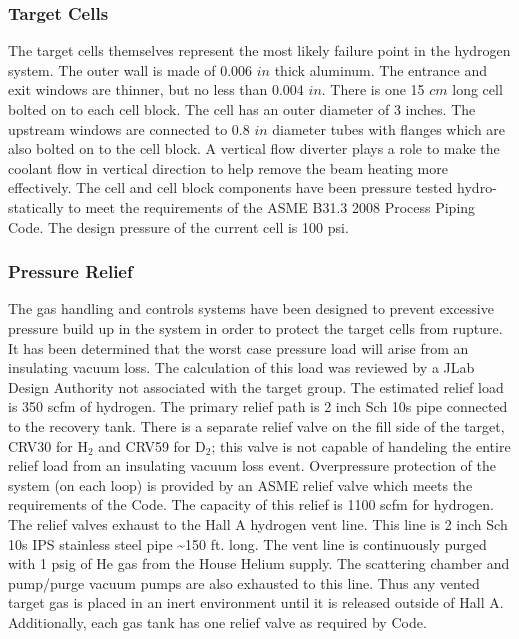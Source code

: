 \subsubsection{Target Cells}

The target cells themselves represent the most likely failure point
in the hydrogen system. The outer wall is made of 0.006 $in$ thick
aluminum. The entrance and exit windows are thinner, but no less than
0.004 $in$. There is one 15 $cm$ long cell bolted on to each cell
block. The cell has an outer diameter of 3 inches. The upstream windows
are connected to 0.8 $in$ diameter tubes with flanges which are also
bolted on to the cell block. A vertical flow diverter plays a role
to make the coolant flow in vertical direction to help remove the
beam heating more effectively. The cell and cell block components
have been pressure tested hydro-statically to meet the requirements
of the ASME B31.3 2008 Process Piping Code. The design pressure of
the current cell is 100 psi.


\subsubsection{Pressure Relief}

The gas handling and controls systems have been designed to prevent
excessive pressure build up in the system in order to protect the
target cells from rupture. It has been determined that the worst case
pressure load will arise from an insulating vacuum loss. The calculation
of this load was reviewed by a JLab Design Authority not associated
with the target group. The estimated relief load is 350 scfm of hydrogen.
The primary relief path is 2 inch Sch 10s pipe connected to the recovery
tank. There is a separate relief valve on the fill side of the target,
CRV30 for H$_{2}$ and CRV59 for D$_{2}$; this valve is not capable
of handeling the entire relief load from an insulating vacuum loss
event. Overpressure protection of the system (on each loop) is provided
by an ASME relief valve which meets the requirements of the Code.
The capacity of this relief is 1100 scfm for hydrogen. The relief
valves exhaust to the Hall A hydrogen vent line. This line is 2 inch
Sch 10s IPS stainless steel pipe \textasciitilde{}150 ft. long. The
vent line is continuously purged with 1 psig of He gas from the House
Helium supply. The scattering chamber and pump/purge vacuum pumps
are also exhausted to this line. Thus any vented target gas is placed
in an inert environment until it is released outside of Hall A. Additionally,
each gas tank has one relief valve as required by Code.

